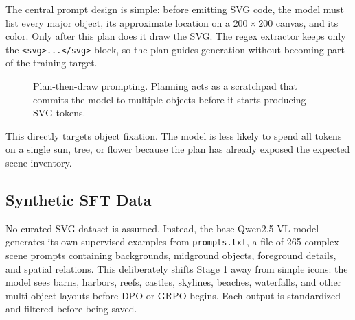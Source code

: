 \documentclass[10pt,twocolumn]{article}
\begin{document}
The central prompt design is simple: before emitting SVG code, the model must
list every major object, its approximate location on a \(200\times200\) canvas,
and its color. Only after this plan does it draw the SVG. The regex extractor
keeps only the \texttt{<svg>...</svg>} block, so the plan guides
generation without becoming part of the training target.

\begin{figure}[t]
\centering
{}
\caption{Plan-then-draw prompting. Planning acts as a scratchpad that commits
the model to multiple objects before it starts producing SVG tokens.}
\label{fig:cot}
\end{figure}

This directly targets object fixation. The model is less likely to spend all
tokens on a single sun, tree, or flower because the plan has already exposed the
expected scene inventory.

\subsection{Synthetic SFT Data}

No curated SVG dataset is assumed. Instead, the base Qwen2.5-VL model generates
its own supervised examples from \texttt{prompts.txt}, a file of 265 complex
scene prompts containing backgrounds, midground objects, foreground details,
and spatial relations. This deliberately shifts Stage 1 away from simple icons:
the model sees barns, harbors, reefs, castles, skylines, beaches, waterfalls,
and other multi-object layouts before DPO or GRPO begins. Each output is
standardized and filtered before being saved.
\end{document}
